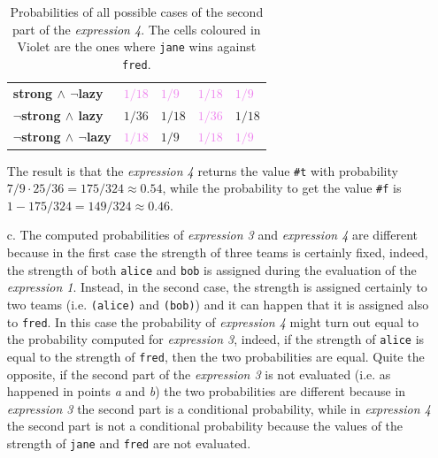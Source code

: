 \begin{itemize}
\begin{table}[H]
\begin{tabular}{| l | C{1.8cm} C{1.8cm} C{1.8cm} C{1.8cm}  |}
                    \textbf{strong $\land$ $\neg$lazy} & \textcolor{Violet}{$1/18$} & \textcolor{Violet}{$1/9$} & 
                        \textcolor{Violet}{$1/18$} & \textcolor{Violet}{$1/9$} \\ 
                    
                    \textbf{$\neg$strong $\land$ lazy} & \textcolor{RedOrange}{$1/36$} & \textcolor{RedOrange}{$1/18$} & 
                        \textcolor{Violet}{$1/36$} & \textcolor{RedOrange}{$1/18$} \\ 
                    
                    \textbf{$\neg$strong $\land$ $\neg$lazy} & \textcolor{Violet}{$1/18$} & \textcolor{RedOrange}{$1/9$} & 
                        \textcolor{Violet}{$1/18$} & \textcolor{Violet}{$1/9$} \\
                    \hline
                \end{tabular}
            \egroup
            \caption{
                Probabilities of all possible cases of the second part of the \textit{expression 4}. 
                The cells coloured in Violet are the ones where \texttt{\textquotesingle jane} wins against \texttt{\textquotesingle fred}.
            }
            \label{tab:exp-4}
        \end{table}

        The result is that the \textit{expression 4} returns the value \texttt{\#t} with probability $7/9 \cdot 25/36 = 175/324 
        \approx 0.54$, while the probability to get the value \texttt{\#f} is $1 - 175/324 = 149/324 \approx 0.46$.

    \item[c.] The computed probabilities of \textit{expression 3} and \textit{expression 4} are different because in the first case
        the strength of three teams is certainly fixed, indeed, the strength of both \texttt{\textquotesingle alice} and \texttt{\textquotesingle bob} is assigned
        during the evaluation of the \textit{expression 1}. Instead, in the second case, the strength is assigned certainly to two
        teams (i.e. \texttt{\textquotesingle (alice)} and \texttt{\textquotesingle (bob)}) and it can happen that it is assigned also to \texttt{\textquotesingle fred}. In this case
        the probability of \textit{expression 4} might turn out equal to the probability computed for \textit{expression 3}, indeed,
        if the strength of \texttt{\textquotesingle alice} is equal to the strength of \texttt{\textquotesingle fred}, then the two probabilities are equal.
        Quite the opposite, if the second part of the \textit{expression 3} is not evaluated (i.e. as happened in points \textit{a}
        and \textit{b}) the two probabilities are different because in \textit{expression 3} the second part is a conditional
        probability, while in \textit{expression 4} the second part is not a conditional probability because the values of the
        strength of \texttt{\textquotesingle jane} and \texttt{\textquotesingle fred} are not evaluated.


\end{itemize}
